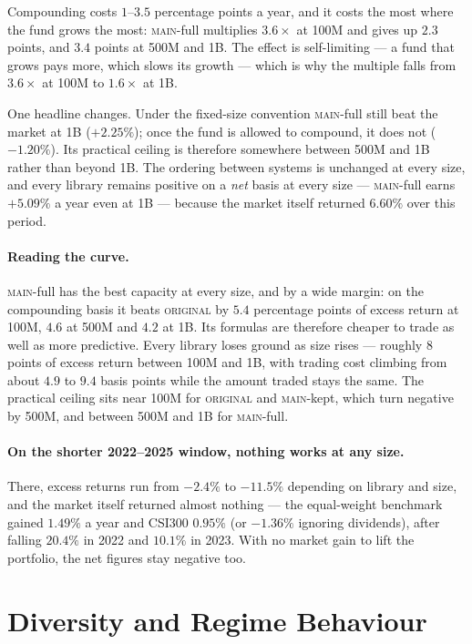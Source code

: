 \documentclass[11pt]{article}
\newcommand{\main}{\textsc{main}}
\newcommand{\orig}{\textsc{original}}
\begin{document}
\noindent Compounding costs $1$--$3.5$ percentage points a year, and it costs the most
where the fund grows the most: \main{}-full multiplies $3.6\times$ at 100M and gives up
$2.3$ points, and $3.4$ points at 500M and 1B. The effect is self-limiting --- a fund
that grows pays more, which slows its growth --- which is why the multiple falls from
$3.6\times$ at 100M to $1.6\times$ at 1B.

One headline changes. Under the fixed-size convention \main{}-full still beat the
market at 1B ($+2.25\%$); once the fund is allowed to compound, it does not
($-1.20\%$). Its practical ceiling is therefore somewhere between 500M and 1B rather
than beyond 1B. The ordering between systems is unchanged at every size, and every
library remains positive on a \emph{net} basis at every size --- \main{}-full earns
$+5.09\%$ a year even at 1B --- because the market itself returned $6.60\%$ over this
period.

\paragraph{Reading the curve.}
\main{}-full has the best capacity at every size, and by a wide margin: on the
compounding basis it beats \orig{} by $5.4$ percentage points of excess return at
100M, $4.6$ at 500M and $4.2$ at 1B. Its formulas are therefore cheaper to trade as
well as more predictive. Every library loses ground as size rises --- roughly $8$
points of excess return between 100M and 1B, with trading cost climbing from about
$4.9$ to $9.4$ basis points while the amount traded stays the same. The practical
ceiling sits near 100M for \orig{} and \main{}-kept, which turn negative by 500M, and
between 500M and 1B for \main{}-full.

\paragraph{On the shorter 2022--2025 window, nothing works at any size.}
There, excess returns run from $-2.4\%$ to $-11.5\%$ depending on library and size, and
the market itself returned almost nothing --- the equal-weight benchmark gained
$1.49\%$ a year and CSI300 $0.95\%$ (or $-1.36\%$ ignoring dividends), after falling
$20.4\%$ in 2022 and $10.1\%$ in 2023. With no market gain to lift the portfolio, the
net figures stay negative too.

\section{Diversity and Regime Behaviour}
\label{sec:diversity}
\end{document}
